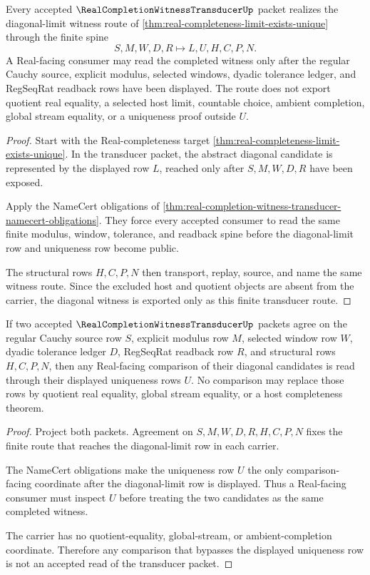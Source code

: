 \begin{theorem}
\label{thm:real-completion-witness-transducer-diagonal-route}
Every accepted $\RealCompletionWitnessTransducerUp$ packet realizes the diagonal-limit witness route of \autoref{thm:real-completeness-limit-exists-unique} through the finite spine
$$
S,M,W,D,R \longmapsto L,U,H,C,P,N .
$$
A Real-facing consumer may read the completed witness only after the regular Cauchy source, explicit modulus, selected windows, dyadic tolerance ledger, and RegSeqRat readback rows have been displayed. The route does not export quotient real equality, a selected host limit, countable choice, ambient completion, global stream equality, or a uniqueness proof outside $U$.
\end{theorem}
\begin{proof}
Start with the Real-completeness target \autoref{thm:real-completeness-limit-exists-unique}. In the transducer packet, the abstract diagonal candidate is represented by the displayed row $L$, reached only after $S,M,W,D,R$ have been exposed.

Apply the NameCert obligations of \autoref{thm:real-completion-witness-transducer-namecert-obligations}. They force every accepted consumer to read the same finite modulus, window, tolerance, and readback spine before the diagonal-limit row and uniqueness row become public.

The structural rows $H,C,P,N$ then transport, replay, source, and name the same witness route. Since the excluded host and quotient objects are absent from the carrier, the diagonal witness is exported only as this finite transducer route.
\end{proof}

\begin{theorem}
\label{thm:real-completion-witness-transducer-uniqueness-handoff}
If two accepted $\RealCompletionWitnessTransducerUp$ packets agree on the regular Cauchy source row $S$, explicit modulus row $M$, selected window row $W$, dyadic tolerance ledger $D$, RegSeqRat readback row $R$, and structural rows $H,C,P,N$, then any Real-facing comparison of their diagonal candidates is read through their displayed uniqueness rows $U$. No comparison may replace those rows by quotient real equality, global stream equality, or a host completeness theorem.
\end{theorem}
\begin{proof}
Project both packets. Agreement on $S,M,W,D,R,H,C,P,N$ fixes the finite route that reaches the diagonal-limit row in each carrier.

The NameCert obligations make the uniqueness row $U$ the only comparison-facing coordinate after the diagonal-limit row is displayed. Thus a Real-facing consumer must inspect $U$ before treating the two candidates as the same completed witness.

The carrier has no quotient-equality, global-stream, or ambient-completion coordinate. Therefore any comparison that bypasses the displayed uniqueness row is not an accepted read of the transducer packet.
\end{proof}

